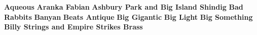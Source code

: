 \noindent \textbf{Aqueous}\newline
\vspace{10pt} 
\newline
\vspace{10pt} 
\noindent \textbf{Aranka Fabian}\newline
\vspace{10pt} 
\newline
\vspace{10pt} 
\noindent \textbf{Ashbury Park and Big Island Shindig}\newline
\vspace{10pt} 
\newline
\vspace{10pt} 
\noindent \textbf{Bad Rabbits}\newline
\vspace{10pt} 
\newline
\vspace{10pt} 
\noindent \textbf{Banyan}\newline
\vspace{10pt} 
\newline
\vspace{10pt} 
\noindent \textbf{Beats Antique}\newline
\vspace{10pt} 
\newline
\vspace{10pt} 
\noindent \textbf{Big Gigantic}\newline
\vspace{10pt} 
\newline
\vspace{10pt} 
\noindent \textbf{Big Light}\newline
\vspace{10pt} 
\newline
\vspace{10pt} 
\noindent \textbf{Big Something}\newline
\vspace{10pt} 
\newline
\vspace{10pt} 
\noindent \textbf{Billy Strings and Empire Strikes Brass}\newline
\vspace{10pt} 
